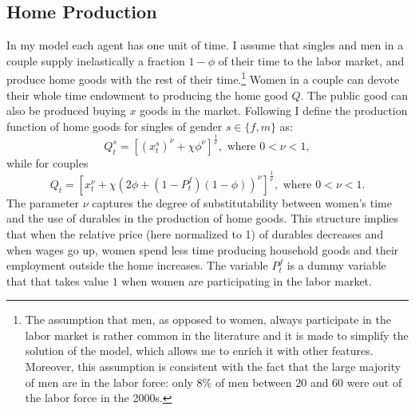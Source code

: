 \documentclass[12pt]{article}
\begin{document}
 \subsection{Home Production}
In my model each agent has one unit of time. I assume that singles and men in a couple supply inelastically a fraction $1-\phi$ of their time to the labor market, and produce home goods with the rest of their time.\footnote{The assumption that men, as opposed to women, always participate in the labor market is rather common in the literature \citep{ciscato2019,low2018,voena2015,reynoso2019} and it is made to simplify the solution of the model, which allows me to enrich it with other features. Moreover, this assumption is consistent with the fact that the large majority of men are in the labor force: only 8\% of men between 20 and 60 were out of the labor force in the 2000s.} Women in a couple can devote their whole time endowment to producing the home good $Q$. The public good can also be produced buying $x$ goods in the market. Following \cite{greenwood2016} I define the production function of home goods for singles of gender $s\in\{f,m\}$ as:
\begin{equation}\label{eq:pfunctions}
Q^s_t=[(x^s_t)^\nu+\chi {\phi}^\nu]^{\frac{1}{\nu}}, \text{ where }0<\nu<1,
\end{equation}
while for couples
\begin{equation}\label{eq:pfunctionc}
Q_t=[x_t^\nu+\chi {(2\phi+(1-P^f_t)(1-\phi))}^\nu]^{\frac{1}{\nu}}, \text{ where }0<\nu<1.
\end{equation}
The parameter $\nu$ captures the degree of substitutability between women's time and the use of durables in the production of home goods. This structure implies that when the relative price (here normalized to 1) of durables decreases and when wages go up, women spend less time producing household goods and their employment outside the home increases. The variable  $P^f_t$ is a dummy variable that that takes value $1$ when women are participating in the labor market.
\end{document}
